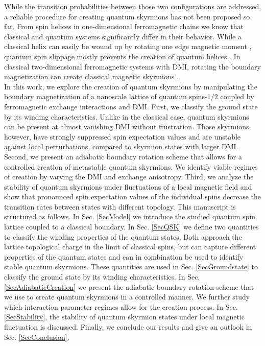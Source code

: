 \documentclass[reprint,aps,prb,superscriptaddress,10pt]{revtex4-2} %
\begin{document}
While the transition probabilities between those two configurations are addressed, a reliable procedure for creating quantum skyrmions has not been proposed so far. From spin helices in one-dimensional ferromagnetic chains we know that classical and quantum systems significantly differ in their behavior. While a classical helix can easily be wound up by rotating one edge magnetic moment \cite{Vedmedenko2014}, quantum spin slippage mostly prevents the creation of quantum helices \cite{Posske2019}.
In classical two-dimensional ferromagnetic systems with DMI, rotating the boundary magnetization can create classical magnetic skyrmions \cite{Schaffer2020}. \\
In this work, we explore the creation of quantum skyrmions by manipulating the boundary magnetization of a nanoscale lattice of quantum spins-$1/2$ coupled by ferromagnetic exchange interactions and DMI. First, we classify the ground state by its winding characteristics. Unlike in the classical case, quantum skyrmions can be present at almost vanishing DMI without frustration. 
Those skyrmions, however, have strongly suppressed spin expectation values and are unstable against local perturbations, compared to skyrmion states with larger DMI.
Second, we present an adiabatic \cite{Kato1950} boundary rotation scheme that allows for a controlled creation of metastable quantum skyrmions. We identify viable regimes of creation by varying the DMI and exchange anisotropy. 
Third, we analyze the stability of quantum skyrmions under fluctuations of a local magnetic field and show that pronounced spin expectation values of the individual spins decrease the transition rates between states with different topology.
This manuscript is structured as follows.
In Sec. \ref{SecModel} we introduce the studied quantum spin lattice coupled to a classical boundary. 
In Sec. \ref{SecQSK} we define two quantities to classify the winding properties of the quantum states. Both approach the lattice topological charge in the limit of classical spins, but can capture different properties of the quantum states and can in combination be used to identify stable quantum skyrmions. These quantities are used in Sec. \ref{SecGroundstate} to classify the ground state by its winding characteristics.
In Sec. \ref{SecAdiabaticCreation} we present the adiabatic \cite{Kato1950} boundary rotation scheme that we use to create quantum skyrmions in a controlled manner. We further study which interaction parameter regimes allow for the creation process.
In Sec. \ref{SecStability}, the stability of quantum skyrmion states under local magnetic fluctuation is discussed. Finally, we conclude our results and give an outlook in Sec. \ref{SecConclusion}.
\end{document}
